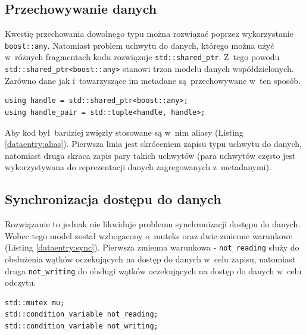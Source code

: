 \subsection{Przechowywanie danych}
Kwestię przechowania dowolnego typu można rozwiązać poprzez wykorzystanie \lstinline$boost::any$. Natomiast problem uchwytu do danych, którego można użyć w~różnych fragmentach kodu rozwiązuje \lstinline$std::shared_ptr$. Z~tego powodu \lstinline$std::shared_ptr<boost::any>$ stanowi trzon modelu danych współdzielonych. Zarówno dane jak i~towarzyszące im metadane są przechowywane w~ten sposób. 
 
\begin{minipage}{\textwidth}
	\begin{lstlisting}[label=dataentry:alias, caption={Aliasy używane w~kodzie aplikacji},alsoletter={()[].=}]
using handle = std::shared_ptr<boost::any>;
using handle_pair = std::tuple<handle, handle>;
	\end{lstlisting}
\end{minipage}

Aby kod był bardziej zwięzły stosowane są w~nim aliasy (Listing \ref{dataentry:alias}). Pierwsza linia jest skróceniem zapisu typu uchwytu do danych, natomiast druga skraca zapis pary takich uchwytów (para uchwytów często jest wykorzystywana do reprezentacji danych zagregowanych z~metadanymi).

\subsection{Synchronizacja dostępu do danych}
Rozwiązanie to jednak nie likwiduje problemu synchronizacji dostępu do danych. Wobec tego model został wzbogacony o~muteks oraz dwie zmienne warunkowe (Listing \ref{dataentry:sync}). Pierwsza zmienna warunkowa - \lstinline$not_reading$ służy do obsłużenia wątków oczekujących na dostęp do danych w~celu zapisu, natomiast druga \lstinline$not_writing$ do obsługi wątków oczekujących na dostęp do danych w~celu odczytu.

\begin{minipage}{\textwidth}
	\begin{lstlisting}[label=dataentry:sync, caption={Składowe klasy \lstinline$DataEntry$ zapewniające bezpieczne użycie w~środowisku wielowątkowym},alsoletter={()[].=}]
std::mutex mu;
std::condition_variable not_reading;
std::condition_variable not_writing;
	\end{lstlisting}
\end{minipage}

